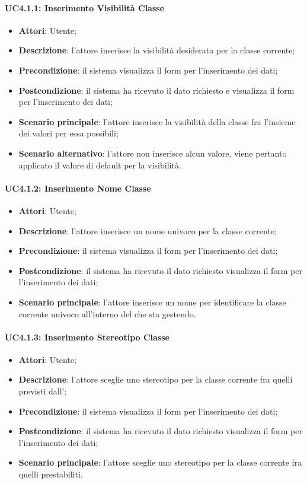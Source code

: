 \paragraph{UC4.1.1: Inserimento Visibilità Classe}
\label{UC4.1.1}
\begin{itemize}
	\item \textbf{Attori}: Utente;
	\item \textbf{Descrizione}: l'attore inserisce la visibilità desiderata per la classe corrente;
	\item \textbf{Precondizione}: il sistema visualizza il form per l'inserimento dei dati;
	\item \textbf{Postcondizione}: il sistema ha ricevuto il dato richiesto e visualizza il form per l'inserimento dei dati;
	\item \textbf{Scenario principale}: l'attore inserisce la visibilità della classe fra l'insieme dei valori per essa possibili;
	\item \textbf{Scenario alternativo}: l'attore non inserisce alcun valore, viene pertanto applicato il valore di default per la visibilità.
\end{itemize}

\paragraph{UC4.1.2: Inserimento Nome Classe}
\label{UC4.1.2}
\begin{itemize}
	\item \textbf{Attori}: Utente;
	\item \textbf{Descrizione}: l'attore inserisce un nome univoco per la classe corrente;
	\item \textbf{Precondizione}: il sistema visualizza il form per l'inserimento dei dati;
	\item \textbf{Postcondizione}: il sistema ha ricevuto il dato richiesto visualizza il form per l'inserimento dei dati;
	\item \textbf{Scenario principale}: l'attore inserisce un nome per identificare la classe corrente univoco all'interno del  che sta gestendo.
\end{itemize}

\paragraph{UC4.1.3: Inserimento Stereotipo Classe}
\label{UC4.1.3}
\begin{itemize}
	\item \textbf{Attori}: Utente;
	\item \textbf{Descrizione}: l'attore sceglie uno stereotipo per la classe corrente fra quelli previsti dall';
	\item \textbf{Precondizione}: il sistema visualizza il form per l'inserimento dei dati;
	\item \textbf{Postcondizione}: il sistema ha ricevuto il dato richiesto visualizza il form per l'inserimento dei dati;
	\item \textbf{Scenario principale}: l'attore sceglie uno stereotipo per la classe corrente fra quelli prestabiliti.
\end{itemize}

